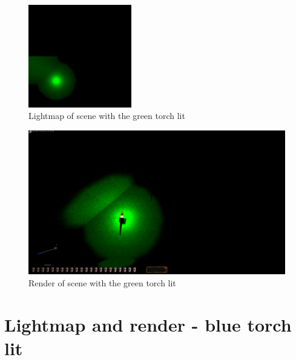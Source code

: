 \begin{appendix}
\begin{figure}[htbp]
	\centering
		\includegraphics[width=0.40\textwidth]{img/PIX/g.png}
	\caption[Lightmap of scene with the green torch lit]{Lightmap of scene with the green torch lit}
	\label{fig:LightmapG}
\end{figure}
\begin{figure}[htbp]
	\centering
		\includegraphics[width=1.00\textwidth]{img/PIX/render_g.png}
	\caption[Render of scene with the green torch lit]{Render of scene with the green torch lit}
	\label{fig:RenderG}
\end{figure}

\clearpage
{}
\section{Lightmap and render - blue torch lit} 


\end{appendix}

